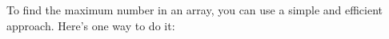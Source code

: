 \documentclass[preview]{standalone}
\begin{document}
To find the maximum number in an array, you can use a simple and efficient approach. Here's one way to do it:\\
\end{document}
